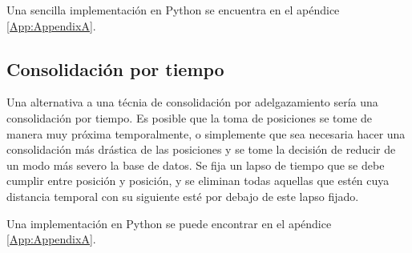 \documentclass[a4paper, 12pt]{article}
\begin{document}
\begin{algorithm}[H]\label{consolidationByEachSomeNumber}
\begin{algorithmic}[1]
			\EndFor
		\EndIf
	\EndFor
\EndFunction
\end{algorithmic}
\caption{\label{alg:consolidationByThinning} Algoritmo de consolidaci\'on por adelgazamiento}
\end{algorithm}

Una sencilla implementaci\'on en Python se encuentra en el ap\'endice \ref{App:AppendixA}.\\
\pagebreak
\subsection{Consolidaci\'on por tiempo}

Una alternativa a una t\'ecnia de consolidaci\'on por adelgazamiento ser\'ia una consolidaci\'on por tiempo. Es posible que la toma de posiciones se tome de manera muy pr\'oxima temporalmente, o simplemente que sea necesaria hacer una consolidaci\'on m\'as dr\'astica de las posiciones y se tome la decisi\'on de reducir de un modo m\'as severo la base de datos. Se fija un lapso de tiempo que se debe cumplir entre posici\'on y posici\'on, y se eliminan todas aquellas que est\'en cuya distancia temporal con su siguiente est\'e por debajo de este lapso fijado.\\


\begin{algorithm}[H]\label{consolidationByTime}
\begin{algorithmic}[1]
		\EndIf
	\EndFor
\EndFunction
\State{}
	\Else
	\EndIf
\EndFunction
\end{algorithmic}
\caption{\label{alg:consolidationByTime} Algoritmo de consolidaci\'on por tiempo}
\end{algorithm}

Una implementaci\'on en Python se puede encontrar en el ap\'endice \ref{App:AppendixA}.\\
\end{document}
